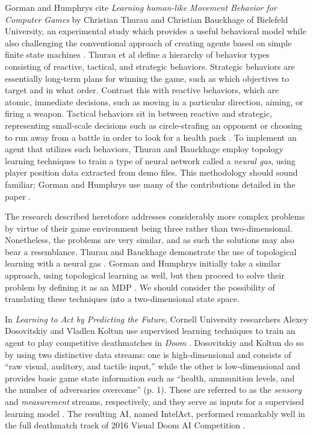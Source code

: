 Gorman and Humphrys cite {\it Learning human-like Movement Behavior for Computer Games} by Christian Thurau and Christian Bauckhage of Bielefeld University, an experimental study which provides a useful behavioral model while also challenging the conventional approach of creating agents based on simple finite state machines \cite{Thurau:2004}. Thurau et al define a hierarchy of behavior types consisting of reactive, tactical, and strategic behaviors. Strategic behaviors are essentially long-term plans for winning the game, such as which objectives to target and in what order. Contrast this with reactive behaviors, which are atomic, immediate decisions, such as moving in a particular direction, aiming, or firing a weapon. Tactical behaviors sit in between reactive and strategic, representing small-scale decisions such as circle-strafing an opponent or choosing to run away from a battle in order to look for a health pack \cite{Gorman:2006}. To implement an agent that utilizes such behaviors, Thurau and Bauckhage employ topology learning techniques to train a type of neural network called a {\it neural gas}, using player position data extracted from demo files. This methodology should sound familiar; Gorman and Humphrys use many of the contributions detailed in the paper \cite{Thurau:2004}.

The research described heretofore addresses considerably more complex problems by virtue of their game environment being three rather than two-dimensional. Nonetheless, the problems are very similar, and as such the solutions may also bear a resemblance. Thurau and Bauckhage demonstrate the use of topological learning with a neural gas \cite{Thurau:2004}. Gorman and Humphrys initially take a similar approach, using topological learning as well, but then proceed to solve their problem by defining it as an MDP \cite{Gorman:2006}. We should consider the possibility of translating these techniques into a two-dimensional state space.

In {\it Learning to Act by Predicting the Future}, Cornell University researchers Alexey Dosovitskiy and Vladlen Koltun use supervised learning techniques to train an agent to play competitive deathmatches in {\it Doom} \cite{VDComp:2016}. Dosovitskiy and Koltun do so by using two distinctive data streams: one is high-dimensional and consists of ``raw visual, auditory, and tactile input,'' while the other is low-dimensional and provides basic game state information such as ``health, ammunition levels, and the number of adversaries overcome'' (p. 1). These are referred to as the {\it sensory} and {\it measurement} streams, respectively, and they serve as inputs for a supervised learning model \cite{Dosovitskiy:2016}. The resulting AI, named IntelAct, performed remarkably well in the full deathmatch track of 2016 Visual Doom AI Competition \cite{VDComp:2016}.

